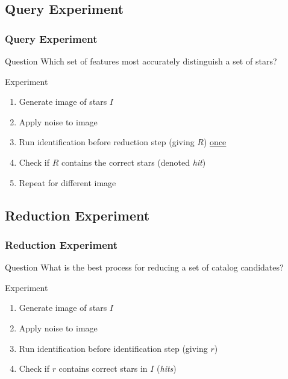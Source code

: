 \documentclass[11pt]{beamer}
\begin{document}
    \subsection{Query Experiment}\label{subsec:queryExperiment}
    \begin{frame}
        \frametitle{Query Experiment}
        \begin{block}{Question}
            Which set of features most accurately distinguish a set of stars?
        \end{block} \medskip
        \begin{block}{Experiment}
            \begin{enumerate}
                \item Generate image of stars $I$
                \item Apply noise to image
                \item Run identification before reduction step (giving $R$) \underline{once}
                \item Check if $R$ contains the correct stars (denoted \textit{hit})
                \item Repeat for different image
            \end{enumerate}
        \end{block}
    \end{frame}

    \subsection{Reduction Experiment}\label{subsec:reductionExperiment}
    \begin{frame}
        \frametitle{Reduction Experiment}
        \begin{block}{Question}
            What is the best process for reducing a set of catalog candidates?
        \end{block} \bigskip
        \begin{block}{Experiment}
            \begin{enumerate}
                \item Generate image of stars $I$
                \item Apply noise to image
                \item Run identification before identification step (giving $r$)
                \item Check if $r$ contains correct stars in $I$ (\textit{hits})
            \end{enumerate}
        \end{block}
    \end{frame}
\end{document}
